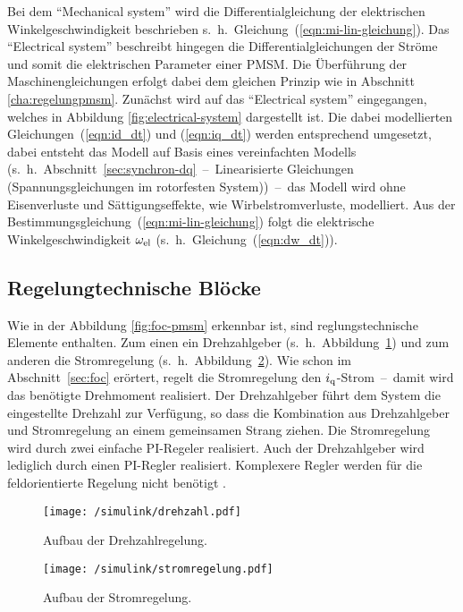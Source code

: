 Bei dem \enquote{Mechanical system} wird die Differentialgleichung der elektrischen Winkelgeschwindigkeit beschrieben s.~h.~Gleichung~(\ref{eqn:mi-lin-gleichung}).
Das \enquote{Electrical system} beschreibt hingegen die Differentialgleichungen der Ströme und somit die elektrischen Parameter einer PMSM.
Die Überführung der Maschinengleichungen erfolgt dabei dem gleichen Prinzip wie in Abschnitt \ref{cha:regelungpmsm}.
Zunächst wird auf das \enquote{Electrical system} eingegangen, welches in Abbildung \ref{fig:electrical-system} dargestellt ist.
Die dabei modellierten Gleichungen~(\ref{eqn:id_dt}) und (\ref{eqn:iq_dt}) werden entsprechend umgesetzt, dabei entsteht das Modell auf Basis eines vereinfachten Modells (s.~h.~Abschnitt~\ref{sec:synchron-dq}~--~Linearisierte Gleichungen (Spannungsgleichungen im rotorfesten System))~--~das Modell wird ohne Eisenverluste und Sättigungseffekte, wie Wirbelstromverluste, modelliert.
Aus der Bestimmungsgleichung~(\ref{eqn:mi-lin-gleichung}) folgt die elektrische Winkelgeschwindigkeit $\omega_{\mathrm{el}}$ (s.~h.~Gleichung~(\ref{eqn:dw_dt})).

\subsection{Regelungtechnische Blöcke}

Wie in der Abbildung \ref{fig:foc-pmsm} erkennbar ist, sind reglungstechnische Elemente enthalten.
Zum einen ein Drehzahlgeber (s.~h.~Abbildung~\ref{fig:drehzahl}) und zum anderen die Stromregelung (s.~h.~Abbildung~\ref{fig:stromregelung}).
Wie schon im Abschnitt~\ref{sec:foc} erörtert, regelt die Stromregelung den $i_{\mathrm{q}}$-Strom~--~damit wird das benötigte Drehmoment realisiert.
Der Drehzahlgeber führt dem System die eingestellte Drehzahl zur Verfügung, so dass die Kombination aus Drehzahlgeber und Stromregelung an einem gemeinsamen Strang ziehen.
Die Stromregelung wird durch zwei einfache PI-Regeler realisiert.
Auch der Drehzahlgeber wird lediglich durch einen PI-Regler realisiert.
Komplexere Regler werden für die feldorientierte Regelung nicht benötigt \autocites{Perassi2006}{kellner2012}.

\begin{figure}[h]
	\centering
	\texttt{[image: /simulink/drehzahl.pdf]}
	\label{fig:drehzahl}
	\caption{Aufbau der Drehzahlregelung.}
\end{figure}

\begin{figure}[h]
	\centering
	\texttt{[image: /simulink/stromregelung.pdf]}
	\label{fig:stromregelung}
	\caption{Aufbau der Stromregelung.}
\end{figure}

